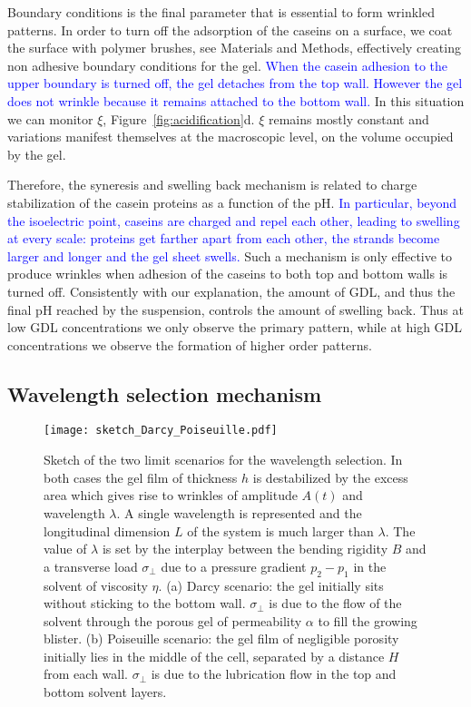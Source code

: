 \documentclass[twocolumn,superscriptaddress,showpacs,preprintnumbers, amsmath,amssymb,prl]{revtex4-1}
\begin{document}
Boundary conditions is the final parameter that is essential to form wrinkled patterns. In order to turn off the adsorption of the caseins on a surface, we coat the surface with polymer brushes, see Materials and Methods, effectively creating non adhesive boundary conditions for the gel. \textcolor{blue}{When the casein adhesion to the upper boundary is turned off, the gel detaches from the top wall. However the gel does not wrinkle because it remains attached to the bottom wall.} In this situation we can monitor $\xi$, Figure~\ref{fig:acidification}d. $\xi$ remains mostly constant and variations manifest themselves at the macroscopic level, on the volume occupied by the gel.

Therefore, the syneresis and swelling back mechanism is related to charge stabilization of the casein proteins as a function of the pH. \textcolor{blue}{In particular, beyond the isoelectric point, caseins are charged and repel each other, leading to swelling at every scale: proteins get farther apart from each other, the strands become larger and longer and the gel sheet swells.} Such a mechanism is only effective to produce wrinkles when adhesion of the caseins to both top and bottom walls is turned off. Consistently with our explanation, the amount of GDL, and thus the final pH reached by the suspension, controls the amount of swelling back. Thus at low GDL concentrations we only observe the primary pattern, while at high GDL concentrations we observe the formation of higher order patterns.

\subsection*{Wavelength selection mechanism}

\begin{figure}
\texttt{[image: sketch\_Darcy\_Poiseuille.pdf]}
\caption{Sketch of the two limit scenarios for the wavelength selection. In both cases the gel film of thickness $h$ is destabilized by the excess area which gives rise to wrinkles of amplitude $A(t)$ and wavelength $\lambda$. A single wavelength is represented and the longitudinal dimension $L$ of the system is much larger than $\lambda$. The value of $\lambda$ is set by the interplay between the bending rigidity $B$ and a transverse load $\sigma_\perp$ due to a pressure gradient $p_2-p_1$ in the solvent of viscosity $\eta$. (a) Darcy scenario: the gel initially sits without sticking to the bottom wall. $\sigma_\perp$ is due to the flow of the solvent through the porous gel of permeability $\alpha$ to fill the growing blister. (b) Poiseuille scenario: the gel film of negligible porosity initially lies in the middle of the cell, separated by a distance $H$ from each wall. $\sigma_\perp$ is due to the lubrication flow in the top and bottom solvent layers.}
\label{fig:sketchDP}
\end{figure}
\end{document}
